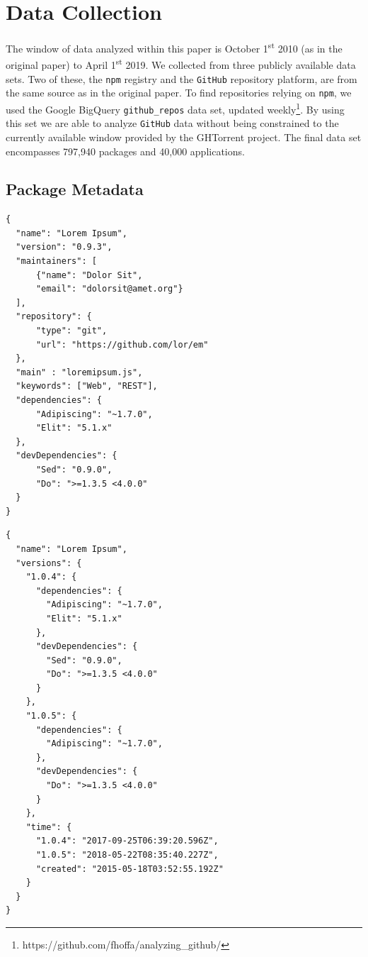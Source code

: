 \documentclass[10pt,conference]{IEEEtran}
\def\code#1{\texttt{#1}}
\begin{document}
\section{Data Collection}
The window of data analyzed within this paper is October 1\textsuperscript{st} 2010 (as in the original paper) to April 1\textsuperscript{st} 2019.
We collected from three publicly available data sets. Two of these, the \code{npm} registry and the \code{GitHub} repository platform, are from the same source as in the original paper.
To find repositories relying on \code{npm}, we used the Google BigQuery \code{github\_repos} data set, updated weekly\footnote{https://github.com/fhoffa/analyzing\_github/}.
By using this set we are able to analyze \code{GitHub} data without being constrained to the currently available window provided by the GHTorrent project\cite{Gousi13}.
The final data set encompasses 797,940 packages and 40,000 applications.

\subsection{Package Metadata} \label{PackageMetadata}

\begin{lstlisting}[caption={A mock \code{npm} package.json. Some fields omitted for brevity.},captionpos=b,
  label=samplePkg, frame=single, firstline=1]
{
  "name": "Lorem Ipsum",
  "version": "0.9.3",
  "maintainers": [
      {"name": "Dolor Sit",
      "email": "dolorsit@amet.org"}
  ],
  "repository": {
      "type": "git",
      "url": "https://github.com/lor/em"
  },
  "main" : "loremipsum.js",
  "keywords": ["Web", "REST"],
  "dependencies": {
      "Adipiscing": "~1.7.0",
      "Elit": "5.1.x"
  },
  "devDependencies": {
      "Sed": "0.9.0",
      "Do": ">=1.3.5 <4.0.0" 
  }
}
\end{lstlisting}

\begin{lstlisting}[caption={A mock simplified \code{npm} metadata file.},captionpos=b,
  label=sampleSimpleMetadata, frame=single, firstline=1]
{
  "name": "Lorem Ipsum",
  "versions": {
    "1.0.4": {
      "dependencies": {
        "Adipiscing": "~1.7.0",
        "Elit": "5.1.x"
      },
      "devDependencies": {
        "Sed": "0.9.0",
        "Do": ">=1.3.5 <4.0.0"
      }
    },
    "1.0.5": {
      "dependencies": {
        "Adipiscing": "~1.7.0",
      },
      "devDependencies": {
        "Do": ">=1.3.5 <4.0.0"
      }
    },
    "time": {
      "1.0.4": "2017-09-25T06:39:20.596Z",
      "1.0.5": "2018-05-22T08:35:40.227Z",
      "created": "2015-05-18T03:52:55.192Z"
    }
  }
}
\end{lstlisting}
\end{document}
